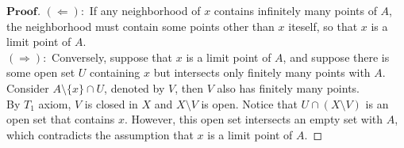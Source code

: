 \documentclass[a4paper, 11pt]{article}
\theoremstyle{definition}
\theoremstyle{remark}
\newenvironment{myprf}
{\renewcommand\qedsymbol{$ $}\begin{proof}[$\mathbf{Proof}$]}
  {\end{proof}}
\theoremstyle{definition}
\begin{document}
\begin{myprf}
        $(\Leftarrow):$ 
        If any neighborhood of $x$ contains infinitely many points of 
      $A$, the neighborhood must contain some points other than $x$ iteself, 
      so that $x$ is a limit point of $A$.\\
      $(\Rightarrow):$ Conversely, suppose that $x$ is a limit point of $A$, and
      suppose there is some open set $U$ containing $x$ but intersects only
      finitely many points with $A$. Consider $A\setminus\{x\}\cap U$, denoted
      by $V$, then $V$ also has finitely many points. \\
      \indent
      By $T_1$ axiom, $V$ 
      is closed in $X$ and $X\setminus V$ is open. Notice that $U\cap (X\setminus
      V)$ is an open set that contains $x$. However, this open set intersects
      an empty set with $A$, which contradicts the assumption 
      that $x$ is a limit point of $A$. 
\end{myprf}
\end{document}
